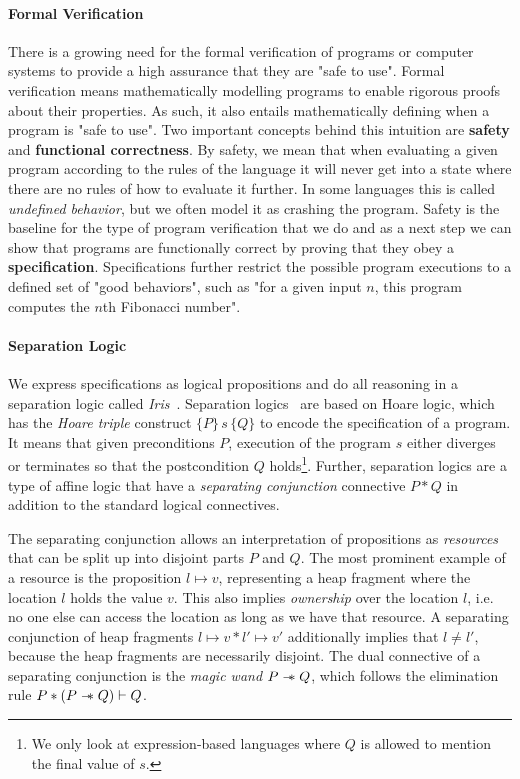 \paragraph{Formal Verification}
There is a growing need for the formal verification of programs or computer systems to provide a high assurance that they are "safe to use".
Formal verification means mathematically modelling programs to enable rigorous proofs about their properties.
As such, it also entails mathematically defining when a program is "safe to use".
Two important concepts behind this intuition are \textbf{safety} and \textbf{functional correctness}.
By safety, we mean that when evaluating a given program according to the rules of the language
it will never get into a state where there are no rules of how to evaluate it further.
In some languages this is called \emph{undefined behavior}, but we often model it as crashing the program.
Safety is the baseline for the type of program verification that we do and as a next step we can show that programs are functionally correct by proving that they obey a \textbf{specification}.
Specifications further restrict the possible program executions to a defined set of "good behaviors", such as "for a given input \(n\), this program computes the \(n\)th Fibonacci number".

\paragraph{Separation Logic}
We express specifications as logical propositions and do all reasoning in a separation logic called \emph{Iris}~\cite{jung2018iris}.
Separation logics~\cite{?} are based on Hoare logic, which has the \emph{Hoare triple} construct \(\{P\}\,s\,\{Q\}\) to encode the specification of a program.
It means that given preconditions \(P\), execution of the program \(s\) either diverges or terminates so that the postcondition \(Q\) holds\footnote{We only look at expression-based languages where \(Q\) is allowed to mention the final value of \(s\).}.
Further, separation logics are a type of affine logic that have a \emph{separating conjunction} connective \(P \ast Q\) in addition to the standard logical connectives.

The separating conjunction allows an interpretation of propositions as \emph{resources} that can be split up into disjoint parts \(P\) and \(Q\).
The most prominent example of a resource is the proposition \(l \mapsto v\), representing a heap fragment where the location \(l\) holds the value \(v\).
This also implies \emph{ownership} over the location \(l\), i.e. no one else can access the location as long as we have that resource.
A separating conjunction of heap fragments \(l \mapsto v \ast l' \mapsto v'\) additionally implies that \(l \neq l'\), because the heap fragments are necessarily disjoint.
The dual connective of a separating conjunction is the \emph{magic wand} \(P \mathrel{-\!\!\ast} Q\), which follows the elimination rule \(P \ast (P \mathrel{-\!\!\ast} Q) \vdash Q\).

